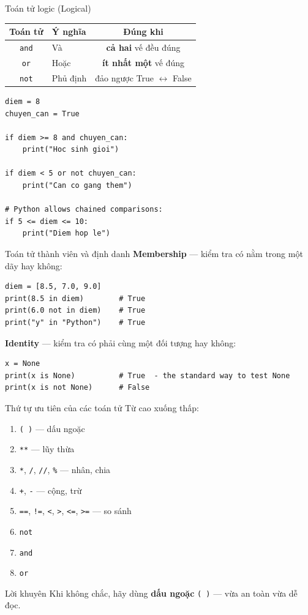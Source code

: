 \documentclass[11pt]{beamer}
\begin{document}
\begin{frame}[fragile]{Toán tử logic (Logical)}
\begin{center}
\begin{tabular}{|c|l|c|}
\hline
\textbf{Toán tử} & \textbf{Ý nghĩa} & \textbf{Đúng khi} \\
\hline
\texttt{and} & Và       & \textbf{cả hai} vế đều đúng \\
\texttt{or}  & Hoặc     & \textbf{ít nhất một} vế đúng \\
\texttt{not} & Phủ định & đảo ngược True $\leftrightarrow$ False \\
\hline
\end{tabular}
\end{center}
\begin{lstlisting}
diem = 8
chuyen_can = True

if diem >= 8 and chuyen_can:
    print("Hoc sinh gioi")

if diem < 5 or not chuyen_can:
    print("Can co gang them")

# Python allows chained comparisons:
if 5 <= diem <= 10:
    print("Diem hop le")
\end{lstlisting}
\end{frame}

\begin{frame}[fragile]{Toán tử thành viên và định danh}
\textbf{Membership} — kiểm tra có nằm trong một dãy hay không:
\begin{lstlisting}
diem = [8.5, 7.0, 9.0]
print(8.5 in diem)        # True
print(6.0 not in diem)    # True
print("y" in "Python")    # True
\end{lstlisting}
\textbf{Identity} — kiểm tra có phải cùng một đối tượng hay không:
\begin{lstlisting}
x = None
print(x is None)          # True  - the standard way to test None
print(x is not None)      # False
\end{lstlisting}
\end{frame}

\begin{frame}{Thứ tự ưu tiên của các toán tử}
Từ cao xuống thấp:
\begin{enumerate}
  \item \texttt{( )} — dấu ngoặc
  \item \texttt{**} — lũy thừa
  \item \texttt{*}, \texttt{/}, \texttt{//}, \texttt{\%} — nhân, chia
  \item \texttt{+}, \texttt{-} — cộng, trừ
  \item \texttt{==}, \texttt{!=}, \texttt{<}, \texttt{>}, \texttt{<=}, \texttt{>=} — so sánh
  \item \texttt{not}
  \item \texttt{and}
  \item \texttt{or}
\end{enumerate}
\begin{block}{Lời khuyên}
Khi không chắc, hãy dùng \textbf{dấu ngoặc} \texttt{( )} — vừa an toàn vừa dễ đọc.
\end{block}
\end{frame}
\end{document}
